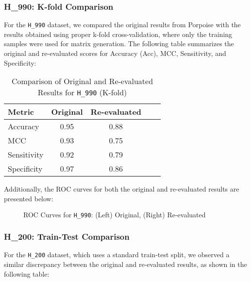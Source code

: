    \subsubsection{H\_990: K-fold Comparison}

      For the \texttt{H\_990} dataset, we compared the original results from Porpoise with the results obtained using proper k-fold cross-validation, where only the training samples were used for matrix generation. The following table summarizes the original and re-evaluated scores for Accuracy (Acc), MCC, Sensitivity, and Specificity:

      \begin{table}[h]
        \centering
        \caption{Comparison of Original and Re-evaluated Results for \texttt{H\_990} (K-fold)}
        \begin{tabular}{lcccc}
          \hline
          \textbf{Metric} & \textbf{Original} & \textbf{Re-evaluated} \\
          \hline
          Accuracy        & 0.95              & 0.88                  \\
          MCC             & 0.93              & 0.75                  \\
          Sensitivity     & 0.92              & 0.79                  \\
          Specificity     & 0.97              & 0.86                  \\
          \hline
        \end{tabular}
      \end{table}

      Additionally, the ROC curves for both the original and re-evaluated results are presented below:

      \begin{figure}[h]
        \centering
        \caption{ROC Curves for \texttt{H\_990}: (Left) Original, (Right) Re-evaluated}
      \end{figure}

    \subsubsection{H\_200: Train-Test Comparison}

      For the \texttt{H\_200} dataset, which uses a standard train-test split, we observed a similar discrepancy between the original and re-evaluated results, as shown in the following table:

